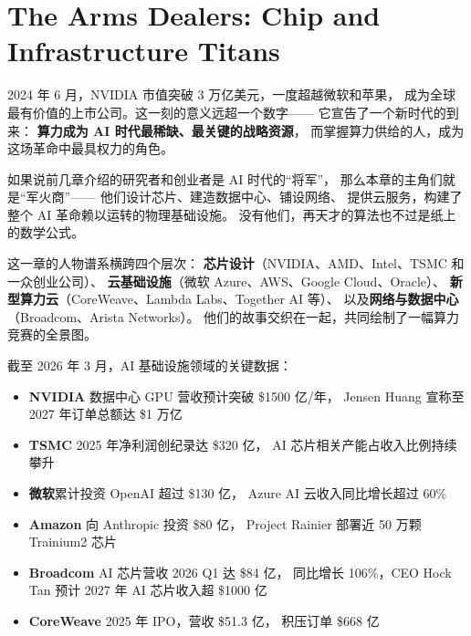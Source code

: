 
\chapter{The Arms Dealers: Chip and Infrastructure Titans}
\label{ch:infrastructure}

2024 年 6 月，NVIDIA 市值突破 3 万亿美元，一度超越微软和苹果，
成为全球最有价值的上市公司。这一刻的意义远超一个数字——
它宣告了一个新时代的到来：
\textbf{算力成为 AI 时代最稀缺、最关键的战略资源}，
而掌握算力供给的人，成为这场革命中最具权力的角色。

如果说前几章介绍的研究者和创业者是 AI 时代的``将军''，
那么本章的主角们就是``军火商''——
他们设计芯片、建造数据中心、铺设网络、
提供云服务，构建了整个 AI 革命赖以运转的物理基础设施。
没有他们，再天才的算法也不过是纸上的数学公式。

这一章的人物谱系横跨四个层次：
\textbf{芯片设计}（NVIDIA、AMD、Intel、TSMC 和一众创业公司）、
\textbf{云基础设施}（微软 Azure、AWS、Google Cloud、Oracle）、
\textbf{新型算力云}（CoreWeave、Lambda Labs、Together AI 等）、
以及\textbf{网络与数据中心}（Broadcom、Arista Networks）。
他们的故事交织在一起，共同绘制了一幅算力竞赛的全景图。

\begin{corebox}
截至 2026 年 3 月，AI 基础设施领域的关键数据：
\begin{itemize}[noitemsep]
  \item \textbf{NVIDIA} 数据中心 GPU 营收预计突破 \$1500 亿/年，
        Jensen Huang 宣称至 2027 年订单总额达 \$1 万亿
  \item \textbf{TSMC} 2025 年净利润创纪录达 \$320 亿，
        AI 芯片相关产能占收入比例持续攀升
  \item \textbf{微软}累计投资 OpenAI 超过 \$130 亿，
        Azure AI 云收入同比增长超过 60\%
  \item \textbf{Amazon} 向 Anthropic 投资 \$80 亿，
        Project Rainier 部署近 50 万颗 Trainium2 芯片
  \item \textbf{Broadcom} AI 芯片营收 2026 Q1 达 \$84 亿，
        同比增长 106\%，CEO Hock Tan 预计 2027 年 AI 芯片收入超 \$1000 亿
  \item \textbf{CoreWeave} 2025 年 IPO，营收 \$51.3 亿，
        积压订单 \$668 亿
\end{itemize}
\end{corebox}

